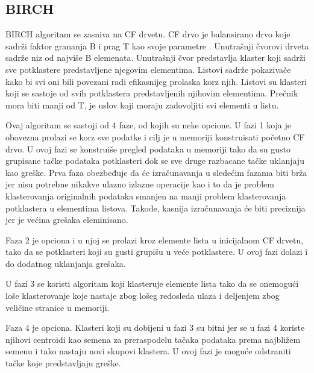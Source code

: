 \documentclass[a4paper]{article}
\begin{document}
\subsection{BIRCH}
BIRCH algoritam se zasniva na CF drvetu. CF drvo je balansirano drvo koje sadrži faktor grananja B i prag T kao svoje parametre \cite{BIRCH}. Unutrašnji čvorovi drveta sadrže niz od najviše B elemenata. Unutrašnji čvor predstavlja klaster koji sadrži sve potklastere predstavljene njegovim elementima. Listovi sadrže pokazivače kako bi svi oni bili povezani radi efikasnijeg prolaska korz njih. Listovi su
klasteri koji se sastoje od svih potklastera predstavljenih njihovim elementima. Prečnik mora biti manji od T, je uslov koji moraju zadovoljiti svi elementi u listu.

Ovaj algoritam se sastoji od 4 faze, od kojih su neke opcione. U fazi 1 koja je obavezna prolazi se korz sve podatke i cilj je u memoriji konstruisati početno CF drvo. U ovoj fazi se konstruiše pregled podataka u memoriji tako da su gusto grupisane tačke podataka potklasteri dok se sve druge razbacane tačke uklanjaju kao greške. Prva faza obezbeđuje da će izračunavanja u sledećim fazama biti brža jer
nisu potrebne nikakve ulazno izlazne operacije kao i to da je problem klasterovanja originalnih podataka smanjen na manji problem klasterovanja potklastera u elementima listova. Takođe, kasnija izračunavanja će biti preciznija jer je većina grešaka eleminisano.

Faza 2 je opciona i u njoj se prolazi kroz elemente lista u inicijalnom CF drvetu, tako da se potklasteri koji su gusti grupišu u veće potklastere. U ovoj fazi dolazi i do dodatnog uklanjanja grešaka.

U fazi 3 se koristi algoritam koji klasteruje elemente lista tako da se onemogući loše klasterovanje koje nastaje zbog lošeg redosleda ulaza i deljenjem zbog veličine stranice u memoriji.

Faza 4 je opciona. Klasteri koji su dobijeni u fazi 3 su bitni jer se u fazi 4 koriste njihovi centroidi  kao semena za preraspodelu tačaka podataka prema najbližem semenu i tako nastaju novi skupovi klastera. U ovoj fazi je moguće odstraniti tačke koje predstavljaju greške.
\end{document}
